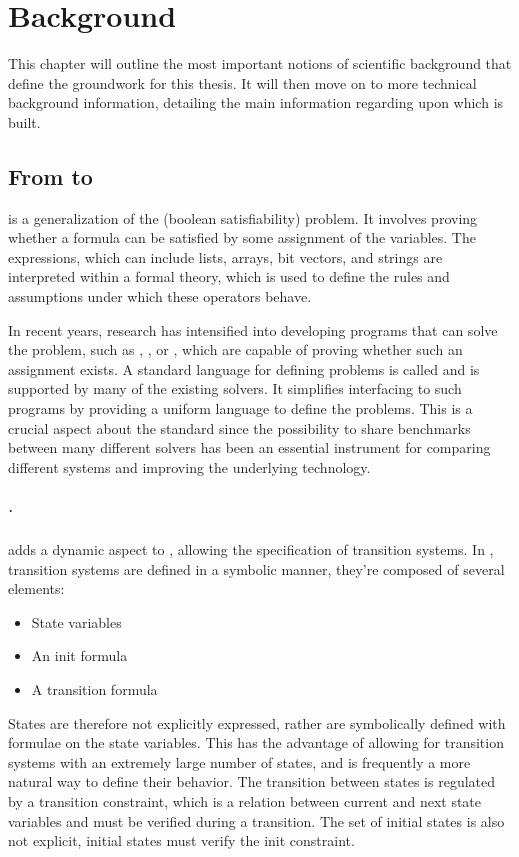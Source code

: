 \chapter{Background}
\label{ch:background}
This chapter will outline the most important notions of scientific background that define the groundwork for this thesis.
It will then move on to more technical background information, detailing the main information regarding \pysmt{} upon which \pyvmt{} is built.

\section{From \smt{} to \vmt{}}

\SMT{} is a generalization of the \sat{} (boolean satisfiability) problem.
It involves proving whether a formula can be satisfied by some assignment of the variables.
The expressions, which can include lists, arrays, bit vectors, and strings are interpreted within a formal theory, which is used to define the rules and assumptions under which these operators behave.

In recent years, research has intensified into developing programs that can solve the \smt{} problem, such as \zthree{} \cite{DBLP:conf/tacas/MouraB08}, \yices{} \cite{DBLP:conf/cav/Dutertre14}, or \mathsat{} \cite{DBLP:conf/tacas/CimattiGSS13}, which are capable of proving whether such an assignment exists.
A standard language for defining \smt{} problems is called \smtlib{} \cite{BarFT-SMTLIB} and is supported by many of the existing solvers.
It simplifies interfacing to such programs by providing a uniform language to define the problems.
This is a crucial aspect about the standard since the possibility to share benchmarks between many different solvers has been an essential instrument for comparing different \smt{} systems and improving the underlying technology.

\paragraph*{\vmt{}.}
\VMT{} adds a dynamic aspect to \smt{}, allowing the specification of transition systems. In \vmt{}, transition systems are defined in a symbolic manner, they're composed of several elements:
\begin{itemize}
    \item State variables
    \item An init formula
    \item A transition formula
\end{itemize}
States are therefore not explicitly expressed, rather are symbolically defined with formulae on the state variables.
This has the advantage of allowing for transition systems with an extremely large number of states, and is frequently a more natural way to define their behavior.
The transition between states is regulated by a transition constraint, which is a relation between current and next state variables and must be verified during a transition. The set of initial states is also not explicit, initial states must verify the init constraint.



